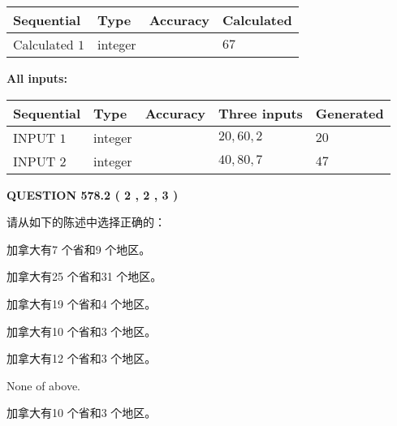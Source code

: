 \documentclass{ctexart}
\begin{document}
  
\noindent\begin{tabular}{|l|l|l|l|}
\hline
 Sequential & Type & Accuracy & Calculated \\ 
\hline
 
 
  Calculated $  1 $ & integer &  & 
  $ 67 $ 
 \\  \hline  
 \end{tabular}
   
   
   
   
\noindent\vspace{0.1in}\hspace{-0.08in} {\textbf{\Large{All inputs: }}}
   
   
  
  
\noindent\begin{tabular}{|l|l|l|l|l|}
\hline
 Sequential & Type & Accuracy & Three inputs & Generated \\ 
\hline
 
 
  INPUT $  1 $ & integer &  & $
 20
 , 
 60
 , 
 2
 $ & $ 20 $ 
 \\  \hline  
 
 
  INPUT $  2 $ & integer &  & $
 40
 , 
 80
 , 
 7
 $ & $ 47 $ 
 \\  \hline  
 \end{tabular}
   
   
  
\vspace{0.2in}
  
{\textbf{\Large{QUESTION
578.2 
 ( 2 , 2 , 3 )
}}}
  
  
请从如下的陈述中选择正确的：
 
 
加拿大有7 个省和9 个地区。
 
 
加拿大有25 个省和31 个地区。
 
 
加拿大有19 个省和4 个地区。
 
 
加拿大有10 个省和3 个地区。
 
 
加拿大有12 个省和3 个地区。
 
 
 None of above.
 
 
\noindent{}
 
 
加拿大有10 个省和3 个地区。
 
 
\noindent{}
 
\end{document}
